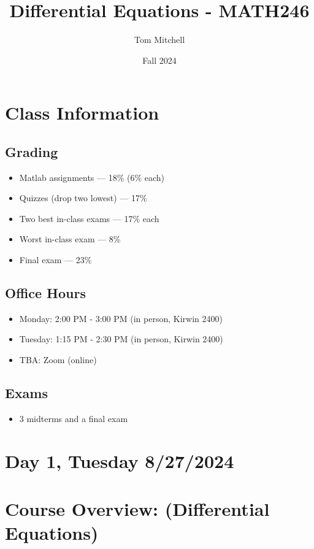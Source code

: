 \documentclass{article}
\title{Differential Equations - MATH246}
\author{Tom Mitchell}
\date{Fall 2024}
\begin{document}
\maketitle

\section*{Class Information}

\subsection*{Grading}
\begin{itemize}
    \item Matlab assignments — 18\% (6\% each)
    \item Quizzes (drop two lowest) — 17\%
    \item Two best in-class exams — 17\% each
    \item Worst in-class exam — 8\%
    \item Final exam — 23\%
\end{itemize}

\subsection*{Office Hours}
\begin{itemize}
    \item Monday: 2:00 PM - 3:00 PM (in person, Kirwin 2400)
    \item Tuesday: 1:15 PM - 2:30 PM (in person, Kirwin 2400)
    \item TBA: Zoom (online)
\end{itemize}

\subsection*{Exams}
\begin{itemize}
    \item 3 midterms and a final exam
\end{itemize}

\section*{Day 1, Tuesday 8/27/2024}

\section*{Course Overview: (Differential Equations)}
\end{document}
